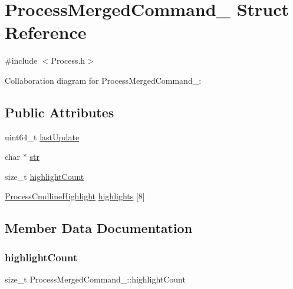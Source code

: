 \hypertarget{structProcessMergedCommand__}{}\section{Process\+Merged\+Command\+\_\+ Struct Reference}
\label{structProcessMergedCommand__}


{\ttfamily \#include $<$Process.\+h$>$}



Collaboration diagram for Process\+Merged\+Command\+\_\+\+:
\subsection*{Public Attributes}
\begin{DoxyCompactItemize}
\item 
uint64\+\_\+t \hyperlink{structProcessMergedCommand___a14b5113b8a21f20b4ad63fbc4b6a6166}{last\+Update}
\item 
char $\ast$ \hyperlink{structProcessMergedCommand___ae63d5b8edbe9c73bb9404fccb1a04a9a}{str}
\item 
size\+\_\+t \hyperlink{structProcessMergedCommand___aad94c3198202dca6aa9263f4bcfdd8ba}{highlight\+Count}
\item 
\hyperlink{Process_8h_a29864e7758234311d4aa9e18e5f01610}{Process\+Cmdline\+Highlight} \hyperlink{structProcessMergedCommand___a4a6b15cf8b1897e6eeba5003ccdd26e2}{highlights} \mbox{[}8\mbox{]}
\end{DoxyCompactItemize}


\subsection{Member Data Documentation}
\mbox{\label{structProcessMergedCommand___aad94c3198202dca6aa9263f4bcfdd8ba}} 
\subsubsection{\texorpdfstring{highlight\+Count}{highlightCount}}
{\footnotesize\ttfamily size\+\_\+t Process\+Merged\+Command\+\_\+\+::highlight\+Count}

\mbox{\label{structProcessMergedCommand___a4a6b15cf8b1897e6eeba5003ccdd26e2}} 
